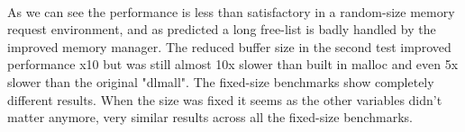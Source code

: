 \documentclass[11pt]{article}
\begin{document}
\paragraph{}
As we can see the performance is less than satisfactory in a random-size memory request environment, and as predicted a long free-list is 
badly handled by the improved memory manager. The reduced buffer size in the second test improved performance x10 but was still almost
10x slower than built in malloc and even 5x slower than the original "dlmall". The fixed-size benchmarks show completely different results.
When the size was fixed it seems as the other variables didn't matter anymore, very similar results across all the fixed-size benchmarks.
\end{document}
